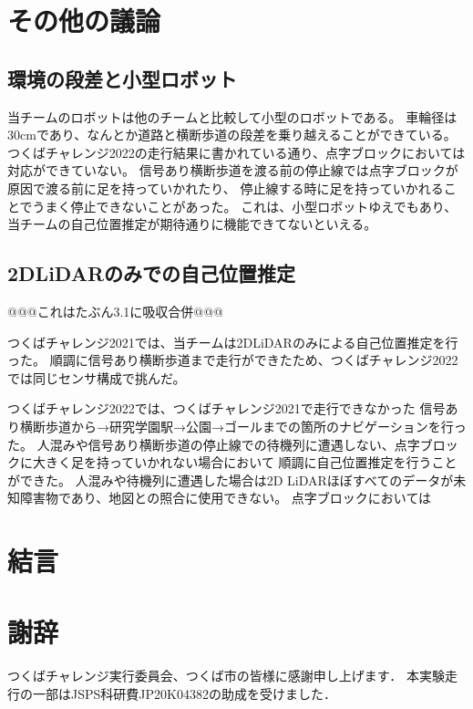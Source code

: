 \documentclass[twocolumn,9pt]{jsproceedings}
\begin{document}
\section{その他の議論}

\subsection{環境の段差と小型ロボット}

当チームのロボットは他のチームと比較して小型のロボットである。
車輪径は30cmであり、なんとか道路と横断歩道の段差を乗り越えることができている。
つくばチャレンジ2022の走行結果に書かれている通り、点字ブロックにおいては対応ができていない。
信号あり横断歩道を渡る前の停止線では点字ブロックが原因で渡る前に足を持っていかれたり、
停止線する時に足を持っていかれることでうまく停止できないことがあった。
これは、小型ロボットゆえでもあり、当チームの自己位置推定が期待通りに機能できてないといえる。

\subsection{2DLiDARのみでの自己位置推定}

@@@これはたぶん3.1に吸収合併@@@

つくばチャレンジ2021では、当チームは2DLiDARのみによる自己位置推定を行った\cite{RTshop}。
順調に信号あり横断歩道まで走行ができたため、つくばチャレンジ2022では同じセンサ構成で挑んだ。

つくばチャレンジ2022では、つくばチャレンジ2021で走行できなかった
信号あり横断歩道から→研究学園駅→公園→ゴールまでの箇所のナビゲーションを行った。
人混みや信号あり横断歩道の停止線での待機列に遭遇しない、点字ブロックに大きく足を持っていかれない場合において
順調に自己位置推定を行うことができた。
人混みや待機列に遭遇した場合は2D LiDARほぼすべてのデータが未知障害物であり、地図との照合に使用できない。
点字ブロックにおいては

\section{結言}

\section*{謝辞}

つくばチャレンジ実行委員会、つくば市の皆様に感謝申し上げます．
本実験走行の一部はJSPS科研費JP20K04382の助成を受けました．

\end{document}
